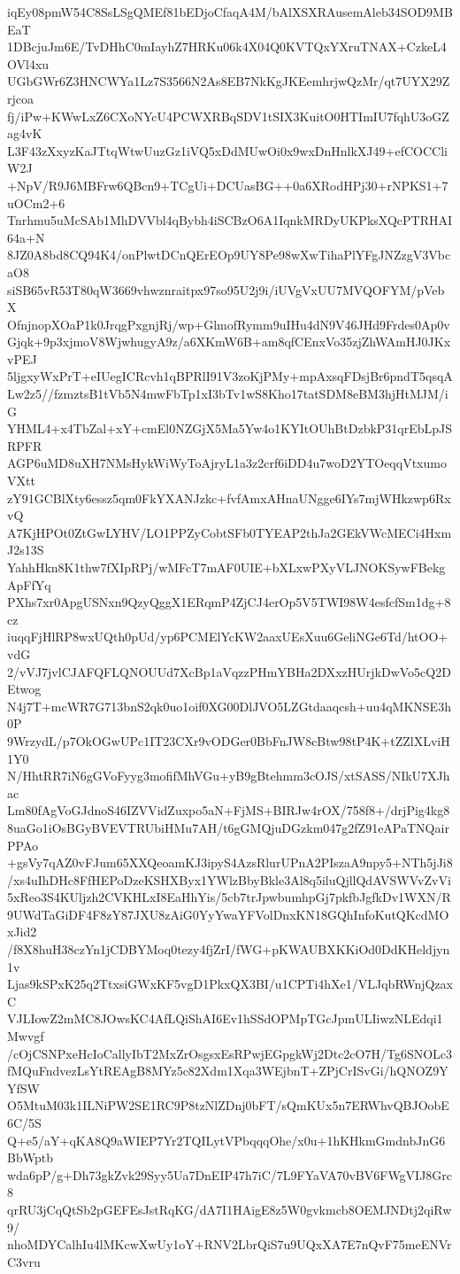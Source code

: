 iqEy08pmW54C8SsLSgQMEf81bEDjoCfaqA4M/bAlXSXRAusemAleb34SOD9MBEaT
1DBcjuJm6E/TvDHhC0mIayhZ7HRKu06k4X04Q0KVTQxYXruTNAX+CzkeL4OVl4xu
UGbGWr6Z3HNCWYa1Lz7S3566N2As8EB7NkKgJKEemhrjwQzMr/qt7UYX29Zrjcoa
fj/iPw+KWwLxZ6CXoNYcU4PCWXRBqSDV1tSIX3KuitO0HTImIU7fqhU3oGZag4vK
L3F43zXxyzKaJTtqWtwUuzGz1iVQ5xDdMUwOi0x9wxDnHnlkXJ49+efCOCCliW2J
+NpV/R9J6MBFrw6QBcn9+TCgUi+DCUasBG++0a6XRodHPj30+rNPKS1+7uOCm2+6
Tnrhmu5uMcSAb1MhDVVbl4qBybh4iSCBzO6A1IqnkMRDyUKPksXQcPTRHAI64a+N
8JZ0A8bd8CQ94K4/onPlwtDCnQErEOp9UY8Pe98wXwTihaPlYFgJNZzgV3VbcaO8
siSB65vR53T80qW3669vhwznraitpx97so95U2j9i/iUVgVxUU7MVQOFYM/pVebX
OfnjnopXOaP1k0JrqgPxgnjRj/wp+GlmofRymm9uIHu4dN9V46JHd9Frdes0Ap0v
Gjqk+9p3xjmoV8WjwhugyA9z/a6XKmW6B+am8qfCEnxVo35zjZhWAmHJ0JKxvPEJ
5ljgxyWxPrT+eIUegICRcvh1qBPRlI91V3zoKjPMy+mpAxsqFDsjBr6pndT5qsqA
Lw2z5//fzmztsB1tVb5N4mwFbTp1xI3bTv1wS8Kho17tatSDM8eBM3hjHtMJM/iG
YHML4+x4TbZal+xY+cmEl0NZGjX5Ma5Yw4o1KYItOUhBtDzbkP31qrEbLpJSRPFR
AGP6uMD8uXH7NMsHykWiWyToAjryL1a3z2crf6iDD4u7woD2YTOeqqVtxumoVXtt
zY91GCBlXty6essz5qm0FkYXANJzkc+fvfAmxAHnaUNgge6IYs7mjWHkzwp6RxvQ
A7KjHPOt0ZtGwLYHV/LO1PPZyCobtSFb0TYEAP2thJa2GEkVWcMECi4HxmJ2s13S
YahhHkn8K1thw7fXIpRPj/wMFcT7mAF0UIE+bXLxwPXyVLJNOKSywFBekgApFfYq
PXhs7xr0ApgUSNxn9QzyQggX1ERqmP4ZjCJ4erOp5V5TWI98W4esfcfSm1dg+8cz
iuqqFjHlRP8wxUQth0pUd/yp6PCMElYcKW2aaxUEsXuu6GeliNGe6Td/htOO+vdG
2/vVJ7jvlCJAFQFLQNOUUd7XcBp1aVqzzPHmYBHa2DXxzHUrjkDwVo5cQ2DEtwog
N4j7T+mcWR7G713bnS2qk0uo1oif0XG00DlJVO5LZGtdaaqcsh+uu4qMKNSE3h0P
9WrzydL/p7OkOGwUPc1IT23CXr9vODGer0BbFnJW8cBtw98tP4K+tZZlXLviH1Y0
N/HhtRR7iN6gGVoFyyg3mofifMhVGu+yB9gBtehmm3cOJS/xtSASS/NIkU7XJhac
Lm80fAgVoGJdnoS46IZVVidZuxpo5aN+FjMS+BIRJw4rOX/758f8+/drjPig4kg8
8uaGo1iOsBGyBVEVTRUbiHMu7AH/t6gGMQjuDGzkm047g2fZ91eAPaTNQairPPAo
+gsVy7qAZ0vFJum65XXQeoamKJ3ipyS4AzsRlurUPnA2PIszaA9npy5+NTh5jJi8
/xs4uIhDHc8FfHEPoDzeKSHXByx1YWlzBbyBkle3Al8q5iluQjllQdAVSWVvZvVi
5xReo3S4KUljzh2CVKHLxI8EaHhYis/5cb7trJpwbumhpGj7pkfbJgfkDv1WXN/R
9UWdTaGiDF4F8zY87JXU8zAiG0YyYwaYFVolDnxKN18GQhInfoKutQKcdMOxJid2
/f8X8huH38czYn1jCDBYMoq0tezy4fjZrI/fWG+pKWAUBXKKiOd0DdKHeldjyn1v
Ljas9kSPxK25q2TtxsiGWxKF5vgD1PkxQX3BI/u1CPTi4hXe1/VLJqbRWnjQzaxC
VJLIowZ2mMC8JOwsKC4AfLQiShAI6Ev1hSSdOPMpTGcJpmULIiwzNLEdqi1Mwvgf
/cOjCSNPxeHcIoCallyIbT2MxZrOsgsxEsRPwjEGpgkWj2Dtc2cO7H/Tg6SNOLc3
fMQuFndvezLsYtREAgB8MYz5c82Xdm1Xqa3WEjbnT+ZPjCrISvGi/hQNOZ9YYfSW
O5MtuM03k1ILNiPW2SE1RC9P8tzNlZDnj0bFT/sQmKUx5n7ERWhvQBJOobE6C/5S
Q+e5/aY+qKA8Q9aWIEP7Yr2TQILytVPbqqqOhe/x0u+1hKHkmGmdnbJnG6BbWptb
wda6pP/g+Dh73gkZvk29Syy5Ua7DnEIP47h7iC/7L9FYaVA70vBV6FWgVIJ8Grc8
qrRU3jCqQtSb2pGEFEsJstRqKG/dA7I1HAigE8z5W0gvkmcb8OEMJNDtj2qiRw9/
nhoMDYCalhIu4lMKcwXwUy1oY+RNV2LbrQiS7u9UQxXA7E7nQvF75meENVrC3vru
